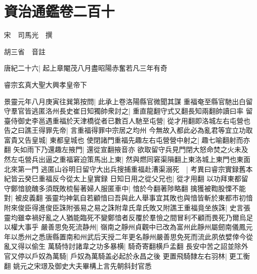 \section{資治通鑑卷二百十}
宋　司馬光　撰

胡三省　音註

唐紀二十六|{
	起上章閹茂八月盡昭陽赤奮若凡三年有奇}


睿宗玄真大聖大興孝皇帝下

景靈元年八月庚寅往巽第按問|{
	此承上卷洛陽縣官微聞其謀}
重福奄至縣官馳出白留守羣官皆逃匿洛州長史崔日知獨帥衆討之|{
	重直龍翻守式又翻長知兩翻帥讀曰率}
留臺侍御史李邕遇重福於天津橋從者已數百人馳至屯營|{
	從才用翻即洛城左右屯營也}
告之曰譙王得罪先帝|{
	言重福得罪中宗居之均州}
今無故入都此必為亂君等宜立功取富貴又告皇城|{
	東都皇城也}
使閉諸門重福先趣左右屯營營中射之|{
	趣七喻翻射而亦翻}
矢如雨下乃還趣左掖門|{
	還從宣翻掖音亦}
欲取留守兵見門閉大怒命焚之火未及然左屯營兵出逼之重福窘迫策馬出上東|{
	然與燃同窘渠隕翻上東洛城上東門也東面北來第一門}
逃匿山谷明日留守大出兵搜捕重福赴漕渠溺死　|{
	考異曰睿宗實録舊本紀皆云癸巳重福反今從太上皇實録}
日知日用之從父兄也|{
	從才用翻}
以功拜東都留守鄭愔貌醜多須既敗梳髻著婦人服匿車中|{
	愔於今翻著陟略翻}
擒獲被鞫股慄不能對|{
	被皮義翻}
張靈均神氣自若顧愔曰吾與此人舉事宜其敗也與愔皆斬於東都市初愔附來俊臣得進俊臣誅附張易之易之誅附韋氏韋氏敗又附譙王重福竟坐族誅|{
	史言張靈均雖幸禍好亂之人猶能臨死不變鄭愔者反覆於羣憸之間冒利不顧而畏死乃爾烏足以權大事乎}
嚴善思免死流静州|{
	嶺南之靜州貞觀中已改為富州此靜州屬劒南儀鳳元年以悉州之悉唐縣置南和州武后天授二年更名靜州嚴善思免死而流此夙依嬖倖今從亂又得以偷生}
萬騎恃討諸韋之功多暴横|{
	騎奇寄翻横戶孟翻}
長安中苦之詔並除外官又停以戶奴為萬騎|{
	戶奴為萬騎盖必起於永昌之後}
更置飛騎隸左右羽林|{
	更工衡翻}
姚元之宋璟及御史大夫畢構上言先朝斜封官悉

